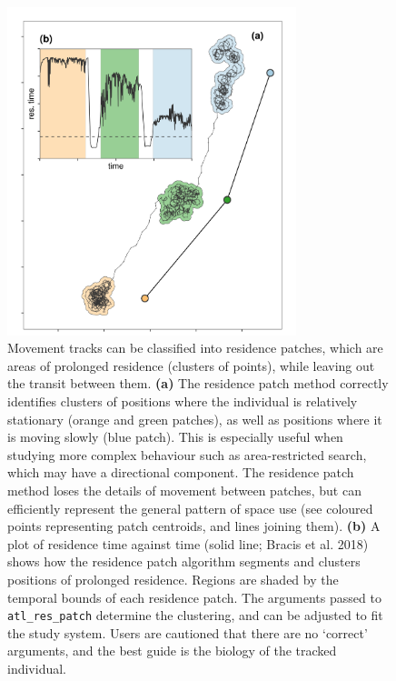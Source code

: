 \documentclass[10pt,paper=a4,headings=standardclasses
]{scrartcl}
\begin{document}
\begin{figure}[h!]
    \centering
    \includegraphics[width=0.75\textwidth]{figures/fig_05_residence.png}
    \caption{Movement tracks can be classified into residence patches, which are areas of prolonged residence (clusters of points), while leaving out the transit between them.
    \textbf{(a)} The residence patch method correctly identifies clusters of positions where the individual is relatively stationary (orange and green patches), as well as positions where it is moving slowly (blue patch).
    This is especially useful when studying more complex behaviour such as area-restricted search, which may have a directional component.
    The residence patch method loses the details of movement between patches, but can efficiently represent the general pattern of space use (see coloured points representing patch centroids, and lines joining them).
    \textbf{(b)} A plot of residence time against time (solid line; Bracis et al. 2018) shows how the residence patch algorithm segments and clusters positions of prolonged residence. 
    Regions are shaded by the temporal bounds of each residence patch.
    The arguments passed to \texttt{atl\_res\_patch} determine the clustering, and can be adjusted to fit the study system.
    Users are cautioned that there are no `correct' arguments, and the best guide is the biology of the tracked individual.}
    \label{fig:figure_residence_patch}
\end{figure}
\end{document}
